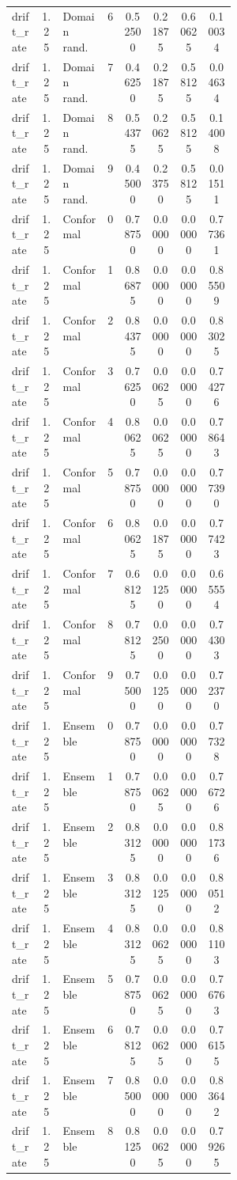 \documentclass{article}
\begin{document}
\begin{center}
\begin{longtable}{p{0.13\linewidth}cp{0.20\linewidth}ccccc}
drift\_rate & 1.25 & Domain rand. & 6 & 0.52500 & 0.21875 & 0.60625 & 0.10034\\
drift\_rate & 1.25 & Domain rand. & 7 & 0.46250 & 0.21875 & 0.58125 & 0.04634\\
drift\_rate & 1.25 & Domain rand. & 8 & 0.54375 & 0.20625 & 0.58125 & 0.14008\\
drift\_rate & 1.25 & Domain rand. & 9 & 0.45000 & 0.23750 & 0.58125 & 0.01511\\
drift\_rate & 1.25 & Conformal & 0 & 0.78750 & 0.00000 & 0.00000 & 0.77361\\
drift\_rate & 1.25 & Conformal & 1 & 0.86875 & 0.00000 & 0.00000 & 0.85509\\
drift\_rate & 1.25 & Conformal & 2 & 0.84375 & 0.00000 & 0.00000 & 0.83025\\
drift\_rate & 1.25 & Conformal & 3 & 0.76250 & 0.00625 & 0.00000 & 0.74276\\
drift\_rate & 1.25 & Conformal & 4 & 0.80625 & 0.00625 & 0.00000 & 0.78643\\
drift\_rate & 1.25 & Conformal & 5 & 0.78750 & 0.00000 & 0.00000 & 0.77390\\
drift\_rate & 1.25 & Conformal & 6 & 0.80625 & 0.01875 & 0.00000 & 0.77423\\
drift\_rate & 1.25 & Conformal & 7 & 0.68125 & 0.01250 & 0.00000 & 0.65554\\
drift\_rate & 1.25 & Conformal & 8 & 0.78125 & 0.02500 & 0.00000 & 0.74303\\
drift\_rate & 1.25 & Conformal & 9 & 0.75000 & 0.01250 & 0.00000 & 0.72370\\
drift\_rate & 1.25 & Ensemble & 0 & 0.78750 & 0.00000 & 0.00000 & 0.77328\\
drift\_rate & 1.25 & Ensemble & 1 & 0.78750 & 0.00625 & 0.00000 & 0.76726\\
drift\_rate & 1.25 & Ensemble & 2 & 0.83125 & 0.00000 & 0.00000 & 0.81736\\
drift\_rate & 1.25 & Ensemble & 3 & 0.83125 & 0.01250 & 0.00000 & 0.80512\\
drift\_rate & 1.25 & Ensemble & 4 & 0.83125 & 0.00625 & 0.00000 & 0.81103\\
drift\_rate & 1.25 & Ensemble & 5 & 0.78750 & 0.00625 & 0.00000 & 0.76763\\
drift\_rate & 1.25 & Ensemble & 6 & 0.78125 & 0.00625 & 0.00000 & 0.76155\\
drift\_rate & 1.25 & Ensemble & 7 & 0.85000 & 0.00000 & 0.00000 & 0.83642\\
drift\_rate & 1.25 & Ensemble & 8 & 0.81250 & 0.00625 & 0.00000 & 0.79265\\

\end{longtable}
\end{center}
\end{document}
